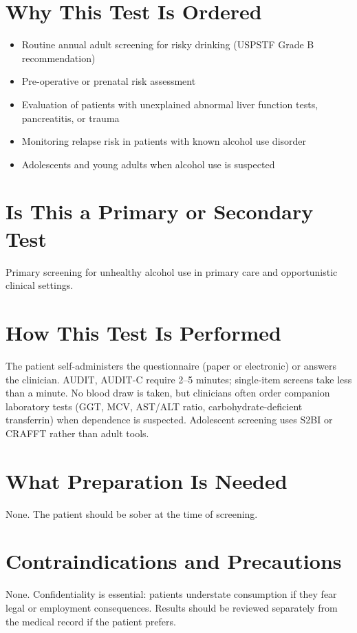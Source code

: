 \section*{Why This Test Is Ordered}
\begin{itemize}
  \item Routine annual adult screening for risky drinking (USPSTF Grade B recommendation)
  \item Pre-operative or prenatal risk assessment
  \item Evaluation of patients with unexplained abnormal liver function tests, pancreatitis, or trauma
  \item Monitoring relapse risk in patients with known alcohol use disorder
  \item Adolescents and young adults when alcohol use is suspected
\end{itemize}

\section*{Is This a Primary or Secondary Test}
Primary screening for unhealthy alcohol use in primary care and opportunistic clinical settings.

\section*{How This Test Is Performed}
The patient self-administers the questionnaire (paper or electronic) or answers the clinician. AUDIT, AUDIT-C require 2--5 minutes; single-item screens take less than a minute. No blood draw is taken, but clinicians often order companion laboratory tests (GGT, MCV, AST/ALT ratio, carbohydrate-deficient transferrin) when dependence is suspected. Adolescent screening uses S2BI or CRAFFT rather than adult tools.

\section*{What Preparation Is Needed}
None. The patient should be sober at the time of screening.

\section*{Contraindications and Precautions}
None. Confidentiality is essential: patients understate consumption if they fear legal or employment consequences. Results should be reviewed separately from the medical record if the patient prefers.

